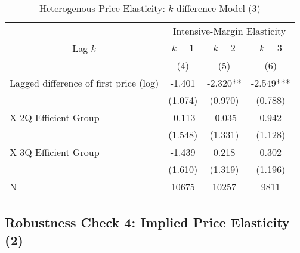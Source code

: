 \documentclass[ review  , 3p ]{elsarticle}
\begin{document}
  \begin{table}

  \caption{\label{tab:kableHeterokDiffElasticitySlide3}Heterogenous Price Elasticity: $k$-difference Model (3)}
  \centering
  \fontsize{8}{10}\selectfont
  \begin{tabular}[t]{lccc}
  \toprule
  \multicolumn{1}{c}{ } & \multicolumn{3}{c}{Intensive-Margin Elasticity} \\
  \cmidrule(l{3pt}r{3pt}){2-4}
  \multicolumn{1}{c}{Lag $k$} & \multicolumn{1}{c}{$k = 1$} & \multicolumn{1}{c}{$k = 2$} & \multicolumn{1}{c}{$k = 3$} \\
  \cmidrule(l{3pt}r{3pt}){1-1} \cmidrule(l{3pt}r{3pt}){2-2} \cmidrule(l{3pt}r{3pt}){3-3} \cmidrule(l{3pt}r{3pt}){4-4}
   & (4) & (5) & (6)\\
  \midrule
  Lagged difference of first price (log) & -1.401 & -2.320** & -2.549***\\
   & (1.074) & (0.970) & (0.788)\\
  \hspace{1em}X 2Q Efficient Group & -0.113 & -0.035 & 0.942\\
   & (1.548) & (1.331) & (1.128)\\
  \hspace{1em}X 3Q Efficient Group & -1.439 & 0.218 & 0.302\\
   & (1.610) & (1.319) & (1.196)\\
  N & 10675 & 10257 & 9811\\
  \bottomrule
  \end{tabular}
  \end{table}

  \hypertarget{robustness-check-4-implied-price-elasticity-2}{%
  \subsection{Robustness Check 4: Implied Price Elasticity (2)}\label{robustness-check-4-implied-price-elasticity-2}}
\end{document}
